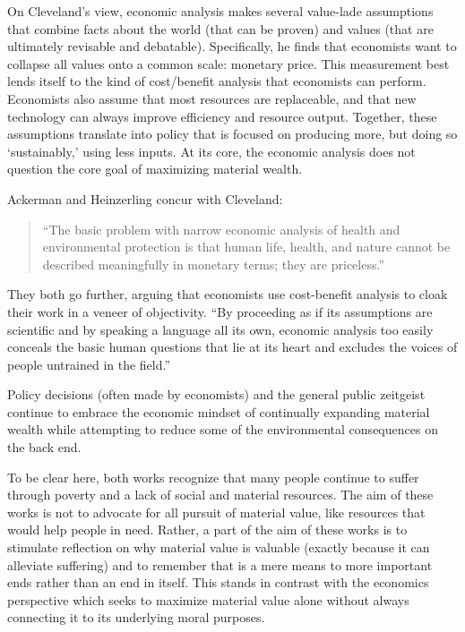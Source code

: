 \documentclass[12pt]{article}
\begin{document}
		On Cleveland’s view, economic analysis makes several value-lade
		assumptions that combine facts about the world (that can be proven) and
		values (that are ultimately revisable and debatable). Specifically, he
		finds that economists want to collapse all values onto a common scale:
		monetary price. This measurement best lends itself to the kind of
		cost/benefit analysis that economists can perform. Economists also
		assume that most resources are replaceable, and that new technology can
		always improve efficiency and resource output. Together, these
		assumptions translate into policy that is focused on producing more,
		but doing so ‘sustainably,’ using less inputs. At its core, the
		economic analysis does not question the core goal of maximizing
		material wealth.\autocite[105]{bop}

		Ackerman and Heinzerling concur with Cleveland: 
		\begin{quote} “The basic problem with narrow economic analysis of
		health and environmental protection is that human life, health, and
	nature cannot be described meaningfully in monetary terms; they are
priceless.”\autocite{pl} \end{quote} They both go further, arguing that
economists use cost-benefit analysis to cloak their work in a veneer of
objectivity.  “By proceeding as if its assumptions are scientific and by
speaking a language all its own, economic analysis too easily conceals the
basic human questions that lie at its heart and excludes the voices of people
		untrained in the field.”\autocite[9]{pl}

		Policy decisions (often made by economists) and the general public
		zeitgeist continue to embrace the economic mindset of continually expanding
		material wealth while attempting to reduce some of the environmental
		consequences on the back end. 

		To be clear here, both works recognize that many people continue to
		suffer through poverty and a lack of social and material resources. The
		aim of these works is not to advocate for all pursuit of material
		value, like resources that would help people in need. Rather, a
		part of the aim of these works is to stimulate reflection on why
		material value is valuable (exactly because it can alleviate suffering)
		and to remember that is a mere means to more important ends rather than
		an end in itself. This stands in contrast with the economics perspective
		which seeks to maximize material value alone without always connecting
		it to its underlying moral purposes.
\end{document}
